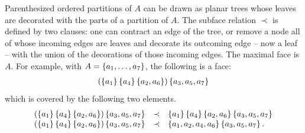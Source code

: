Parenthesized ordered partitions of $A$ can be drawn as planar trees whose leaves are decorated with the parts of a partition of $A$.
The subface relation $\prec$ is defined by two clauses: one can contract an edge of the tree, or remove a node all of whose  incoming edges are leaves and decorate its outcoming edge -- now a leaf -- with the union of the decorations of those incoming edges.
The maximal face is $A$.
For example, with $A=\left\{a_1,\ldots,a_7\right\}$, the following is a face:
$$\begin{array}{l}
(\left\{a_1\right\} \left\{a_4\right\} \left\{a_2,a_6\right\}) \left\{a_3,a_5,a_7\right\}
\end{array}$$
which is covered by the following two elements.
$$\begin{array}{lll}
(\left\{a_1\right\} \left\{a_4\right\} \left\{a_2,a_6\right\}) \left\{a_3,a_5,a_7\right\} & \prec & \left\{a_1\right\} \left\{a_4\right\} \left\{a_2,a_6\right\} \left\{a_3,a_5,a_7\right\} \\
(\left\{a_1\right\} \left\{a_4\right\} \left\{a_2,a_6\right\}) \left\{a_3,a_5,a_7\right\} & \prec &  \left\{a_1,a_2,a_4,a_6\right\} \left\{a_3,a_5,a_7\right\}.
\end{array}$$

